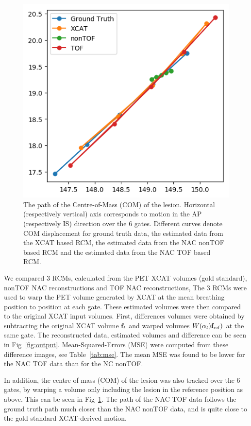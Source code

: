 \documentclass{IEEEtran}
\begin{document}
\begin{figure}
    \centering
    \includegraphics[width=0.7\linewidth]{figures/com_graph.png}
    \caption{The path of the Centre-of-Mass (COM) of the lesion. Horizontal (respectively vertical) axis corresponds to motion in the AP (respectively IS) direction over the $6$ gates. Different curves denote COM displacement for  ground truth data, the estimated data from the XCAT based RCM, the estimated data from the NAC nonTOF based RCM and the estimated data from the NAC TOF based RCM.}
    \label{fig:com_graph}
\end{figure}

We compared $3$ RCMs, calculated from the PET XCAT volumes (gold standard), nonTOF NAC reconstructions and TOF NAC reconstructions, The $3$ RCMs were used to warp the PET volume generated by XCAT at the mean breathing position to position at each gate. These estimated volumes were then compared to the original XCAT input volumes. First, differences volumes were obtained by subtracting the original XCAT volume $\bold{f}_t$ and warped volumes $W(\alpha_t) \bold{f}_\mathrm{ref})$ at the same gate. The reconstructed data, estimated volumes and difference can be seen in Fig~\ref{fig:output}. Mean-Squared-Errors (MSE) were computed from these difference images, see Table~\ref{tab:mse}. The mean MSE was found to be lower for the NAC TOF data than for the NC nonTOF.

In addition, the centre of mass (COM) of the lesion was also tracked over the $6$ gates, by warping a volume only including the lesion in the reference position as above. This can be seen in Fig~\ref{fig:com_graph}. The path of the NAC TOF data follows the ground truth path much closer than the NAC nonTOF data, and is quite close to the gold standard XCAT-derived motion.
\end{document}
